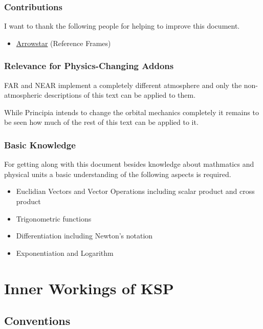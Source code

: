 \documentclass[11pt]{report}
\begin{document}
\section{Contributions}

I want to thank the following people for helping to improve this
document.

\begin{itemize}
\item \href{http://forum.kerbalspaceprogram.com/members/2521}{Arrowstar} (Reference Frames)
\end{itemize}

\section{Relevance for Physics-Changing Addons}

FAR \cite{FAR} and NEAR \cite{NEAR} implement a completely different
atmosphere and only the non-atmospheric descriptions of this text can
be applied to them.

While Principia \cite{principia} intends to change the orbital
mechanics completely it remains to be seen how much of the rest of
this text can be applied to it.

\section{Basic Knowledge}

For getting along with this document besides knowledge about
mathmatics and physical units a basic understanding of the following
aspects is required.
\begin{itemize}
\item Euclidian Vectors \cite{EuclidianVectors} and Vector Operations
  including scalar product \cite{ScalarProduct} and cross product
  \cite{CrossProduct}
\item Trigonometric functions \cite{TrigonometricFunctions}
\item Differentiation including Newton's notation \cite{Differentiation}
\item Exponentiation \cite{Exponentiation} and Logarithm \cite{Logarithm}
\end{itemize}

\part{Inner Workings of KSP}\label{InnerWorkings}

\chapter{Conventions}
\end{document}
